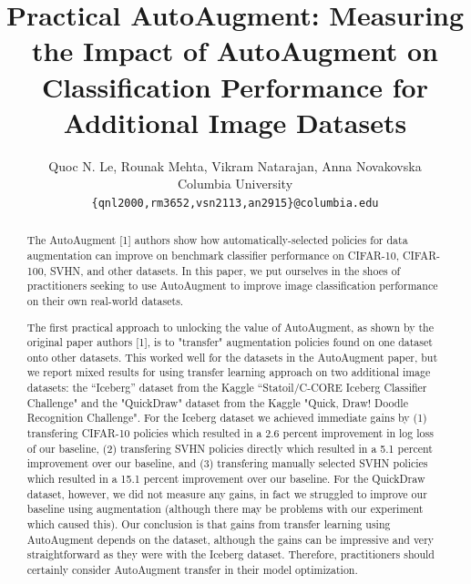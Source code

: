\documentclass[10pt,twocolumn,letterpaper]{article}
\begin{document}
\title{Practical AutoAugment: Measuring the Impact of AutoAugment on Classification Performance for Additional Image Datasets}

\author{Quoc N. Le, Rounak Mehta, Vikram Natarajan, Anna Novakovska\\
Columbia University\\
{\tt\small \{qnl2000,rm3652,vsn2113,an2915\}@columbia.edu}
\\
}

\maketitle

\begin{abstract}
The AutoAugment [1] authors show how automatically-selected policies for data augmentation can improve on benchmark classifier performance on CIFAR-10, CIFAR-100, SVHN, and other datasets.  In this paper, we put ourselves in the shoes of practitioners seeking to use AutoAugment to improve image classification performance on their own real-world datasets.

The first practical approach to unlocking the value of AutoAugment, as shown by the original paper authors [1], is to "transfer" augmentation policies found on one dataset onto other datasets.  This worked well for the datasets in the AutoAugment paper, but we report mixed results for using transfer learning approach on two additional image datasets: the “Iceberg” dataset from the Kaggle “Statoil/C-CORE Iceberg Classifier Challenge" and the "QuickDraw" dataset from the Kaggle "Quick, Draw! Doodle Recognition Challenge".  For the Iceberg dataset we achieved immediate gains by (1) transfering CIFAR-10 policies which resulted in a 2.6 percent improvement in log loss of our baseline, (2) transfering SVHN policies directly which resulted in a 5.1 percent improvement over our baseline, and (3) transfering manually selected SVHN policies which resulted in a 15.1 percent improvement over our baseline.  For the QuickDraw dataset, however, we did not measure any gains, in fact we struggled to improve our baseline using augmentation (although there may be problems with our experiment which caused this).  Our conclusion is that gains from transfer learning using AutoAugment depends on the dataset, although the gains can be impressive and very straightforward as they were with the Iceberg dataset.  Therefore, practitioners should certainly consider AutoAugment transfer in their model optimization.


\end{abstract}
\end{document}
